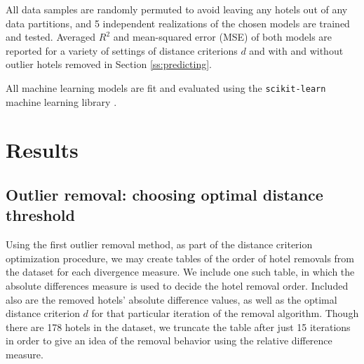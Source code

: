 \documentclass[useAMS, usenatbib]{biom}
\begin{document}
All data samples are randomly permuted to avoid leaving any hotels out of any data partitions, and 5 independent realizations of the chosen models are trained and tested. Averaged $R^2$ and mean-squared error (MSE) of both models are reported for a variety of settings of distance criterions $d$ and with and without outlier hotels removed in Section \ref{ss:predicting}.

All machine learning models are fit and evaluated using the \texttt{scikit-learn} machine learning library \citep{scikit-learn}.

\section{Results}
\label{s:results}

\subsection{Outlier removal: choosing optimal distance threshold}
\label{ss:optimization}

Using the first outlier removal method, as part of the distance criterion optimization procedure, we may create tables of the order of hotel removals from the dataset for each divergence measure. We include one such table, in which the absolute differences measure is used to decide the hotel removal order. Included also are the removed hotels' absolute difference values, as well as the optimal distance criterion $d$ for that particular iteration of the removal algorithm. Though there are 178 hotels in the dataset, we truncate the table after just 15 iterations in order to give an idea of the removal behavior using the relative difference measure.
\end{document}
